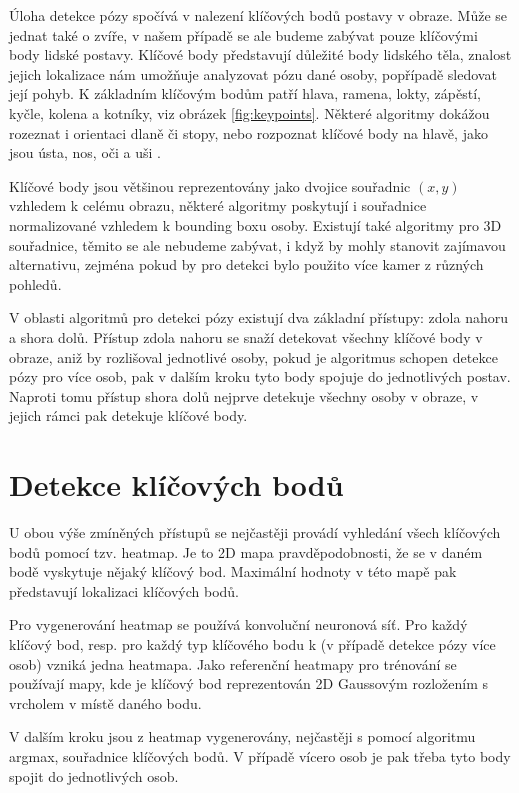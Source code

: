 Úloha detekce pózy spočívá v nalezení klíčových bodů postavy v obraze. Může se
jednat také o zvíře, v našem případě se ale budeme zabývat pouze klíčovými body
lidské postavy. Klíčové body představují důležité body lidského těla, znalost
jejich lokalizace nám umožňuje analyzovat pózu dané osoby, popřípadě sledovat
její pohyb. K základním klíčovým bodům patří hlava, ramena, lokty, zápěstí,
kyčle, kolena a kotníky, viz obrázek \ref{fig:keypoints}. Některé algoritmy dokážou
rozeznat i orientaci dlaně či stopy, nebo rozpoznat klíčové body na hlavě, jako
jsou ústa, nos, oči a uši \cite{blazepose}.

Klíčové body jsou většinou reprezentovány jako dvojice souřadnic $(x, y)$
vzhledem k celému obrazu, některé algoritmy poskytují i souřadnice
normalizované vzhledem k bounding boxu osoby. Existují také algoritmy pro 3D
souřadnice, těmito se ale nebudeme zabývat, i když by mohly stanovit zajímavou
alternativu, zejména pokud by pro detekci bylo použito více kamer z různých
pohledů.

V oblasti algoritmů pro detekci pózy existují dva základní přístupy: zdola
nahoru a shora dolů. Přístup zdola nahoru se snaží detekovat všechny klíčové
body v obraze, aniž by rozlišoval jednotlivé osoby, pokud je algoritmus schopen
detekce pózy pro více osob, pak v dalším kroku tyto body spojuje do
jednotlivých postav. Naproti tomu přístup shora dolů nejprve detekuje všechny
osoby v obraze, v jejich rámci pak detekuje klíčové body.

\section{Detekce klíčových bodů}

U obou výše zmíněných přístupů se nejčastěji provádí vyhledání všech klíčových
bodů pomocí tzv. heatmap. Je to 2D mapa pravděpodobnosti, že se v daném bodě
vyskytuje nějaký klíčový bod. Maximální hodnoty v této mapě pak představují
lokalizaci klíčových bodů.

Pro vygenerování heatmap se používá konvoluční neuronová síť. Pro každý klíčový
bod, resp. pro každý typ klíčového bodu k (v případě detekce pózy více osob)
vzniká jedna heatmapa. Jako referenční heatmapy pro trénování se používají
mapy, kde je klíčový bod reprezentován 2D Gaussovým rozložením s vrcholem v
místě daného bodu.

V dalším kroku jsou z heatmap vygenerovány, nejčastěji s pomocí algoritmu
argmax, souřadnice klíčových bodů. V případě vícero osob je pak třeba tyto body
spojit do jednotlivých osob.

